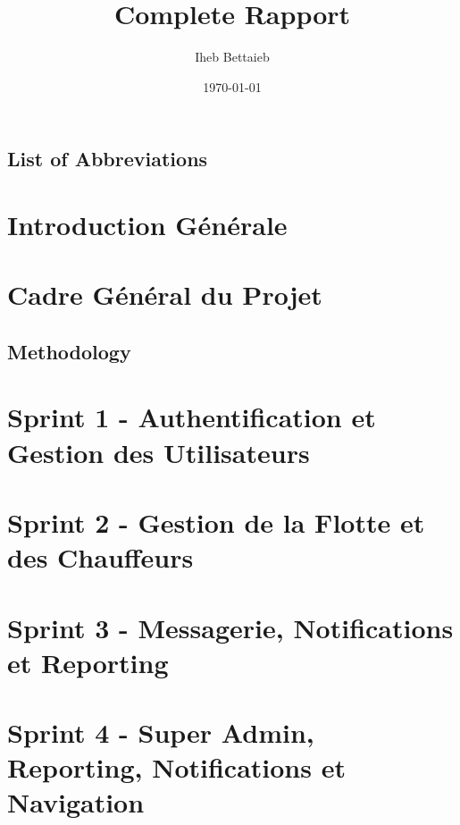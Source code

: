 \documentclass[a4paper,12pt]{report}
\title{Complete Rapport}
\author{Iheb Bettaieb}
\date{\today}
\begin{document}
\maketitle

\begin{acknowledgments}
\end{acknowledgments}

\tableofcontents
\listoffigures
\listoftables

\section*{List of Abbreviations}

\chapter{Introduction Générale}

\chapter{Cadre Général du Projet}
\section{Methodology}

\chapter{Sprint 1 - Authentification et Gestion des Utilisateurs}

\chapter{Sprint 2 - Gestion de la Flotte et des Chauffeurs}

\chapter{Sprint 3 - Messagerie, Notifications et Reporting}

\chapter{Sprint 4 - Super Admin, Reporting, Notifications et Navigation}
\end{document}
